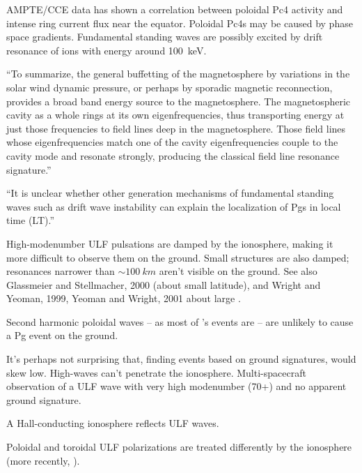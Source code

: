 AMPTE/CCE data has shown a correlation between poloidal Pc4 activity and intense ring current flux near the equator\cite{engebretson_1988}. Poloidal Pc4s may be caused by phase space gradients\cite{dai_2013}. Fundamental standing waves are possibly excited by drift resonance of ions with energy around \SI{100}{\kilo\eV}\cite{thompson_2001,dai_2013}.

``To summarize, the general buffetting of the magnetosphere by variations in the solar wind dynamic pressure, or perhaps by sporadic magnetic reconnection, provides a broad band energy source to the magnetosphere. The magnetospheric cavity as a whole rings at its own eigenfrequencies, thus transporting energy at just those frequencies to field lines deep in the magnetosphere. Those field lines whose eigenfrequencies match one of the cavity eigenfrequencies couple to the cavity mode and resonate strongly, producing the classical field line resonance signature.\cite{hughes_1994}'' 

``It is unclear whether other generation mechanisms of fundamental standing waves such as drift wave instability\cite{green_1979} can explain the localization of Pgs in local time (LT).''\cite{motoba_2015}


High-modenumber ULF pulsations are damped by the ionosphere, making it more difficult to observe them on the ground\cite{hughes_1976}. Small structures are also damped; resonances narrower than $\sim \SI{100}{km}$ aren't visible on the ground. See also Glassmeier and Stellmacher, 2000 (about small latitude), and Wright and Yeoman, 1999, Yeoman and Wright, 2001 about large \azm. 

Second harmonic poloidal waves -- as most of \cite{dai_2015}'s events are -- are unlikely to cause a Pg event on the ground\cite{takahashi_1992}. 

It's perhaps not surprising that, finding events based on ground signatures, \azm would skew low. High-\azm waves can't penetrate the ionosphere. Multi-spacecraft observation of a ULF wave with very high modenumber (70+) and no apparent ground signature\cite{takahashi_2013}. 


A Hall-conducting ionosphere reflects ULF waves\cite{hughes_1974}. 

Poloidal and toroidal ULF polarizations are treated differently by the ionosphere\cite{greifinger_1968} (more recently, \cite{fujita_1988}).  

